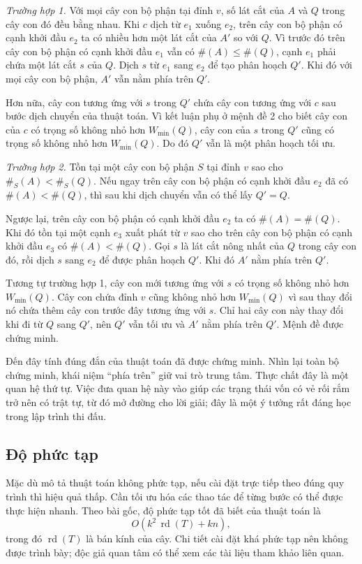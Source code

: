 \documentclass[11pt]{article}
\begin{document}
\emph{Trường hợp 1.} Với mọi cây con bộ phận tại đỉnh $v$, số lát cắt của
$A$ và $Q$ trong cây con đó đều bằng nhau. Khi $c$ dịch từ $e_1$ xuống $e_2$,
trên cây con bộ phận có cạnh khởi đầu $e_2$ ta có nhiều hơn một lát cắt của
$A'$ so với $Q$. Vì trước đó trên cây con bộ phận có cạnh khởi đầu $e_1$ vẫn
có $\#(A)\le \#(Q)$, cạnh $e_1$ phải chứa một lát cắt $s$ của $Q$. Dịch $s$ từ
$e_1$ sang $e_2$ để tạo phân hoạch $Q'$. Khi đó với mọi cây con bộ phận,
$A'$ vẫn nằm phía trên $Q'$.

Hơn nữa, cây con tương ứng với $s$ trong $Q'$ chứa cây con tương ứng với $c$
sau bước dịch chuyển của thuật toán. Vì kết luận phụ ở mệnh đề 2 cho biết cây
con của $c$ có trọng số không nhỏ hơn $W_{\min}(Q)$, cây con của $s$ trong
$Q'$ cũng có trọng số không nhỏ hơn $W_{\min}(Q)$. Do đó $Q'$ vẫn là một phân
hoạch tối ưu.

\emph{Trường hợp 2.} Tồn tại một cây con bộ phận $S$ tại đỉnh $v$ sao cho
$\#_S(A)<\#_S(Q)$. Nếu ngay trên cây con bộ phận có cạnh khởi đầu $e_2$ đã có
$\#(A)<\#(Q)$, thì sau khi dịch chuyển vẫn có thể lấy $Q'=Q$.

Ngược lại, trên cây con bộ phận có cạnh khởi đầu $e_2$ ta có $\#(A)=\#(Q)$.
Khi đó tồn tại một cạnh $e_3$ xuất phát từ $v$ sao cho trên cây con bộ phận có
cạnh khởi đầu $e_3$ có $\#(A)<\#(Q)$. Gọi $s$ là lát cắt nông nhất của $Q$
trong cây con đó, rồi dịch $s$ sang $e_2$ để được phân hoạch $Q'$. Khi đó
$A'$ nằm phía trên $Q'$.

Tương tự trường hợp 1, cây con mới tương ứng với $s$ có trọng số không nhỏ hơn
$W_{\min}(Q)$. Cây con chứa đỉnh $v$ cũng không nhỏ hơn $W_{\min}(Q)$ vì sau
thay đổi nó chứa thêm cây con trước đây tương ứng với $s$. Chỉ hai cây con
này thay đổi khi đi từ $Q$ sang $Q'$, nên $Q'$ vẫn tối ưu và $A'$ nằm phía
trên $Q'$. Mệnh đề được chứng minh.

Đến đây tính đúng đắn của thuật toán đã được chứng minh. Nhìn lại toàn bộ
chứng minh, khái niệm ``phía trên'' giữ vai trò trung tâm. Thực chất đây là
một quan hệ thứ tự. Việc đưa quan hệ này vào giúp các trạng thái vốn có vẻ
rối rắm trở nên có trật tự, từ đó mở đường cho lời giải; đây là một ý tưởng
rất đáng học trong lập trình thi đấu.

\subsection{Độ phức tạp}

Mặc dù mô tả thuật toán không phức tạp, nếu cài đặt trực tiếp theo đúng quy
trình thì hiệu quả thấp. Cần tối ưu hóa các thao tác để từng bước có thể được
thực hiện nhanh. Theo bài gốc, độ phức tạp tốt đã biết của thuật toán là
\[
  O(k^2\,\operatorname{rd}(T)+kn),
\]
trong đó $\operatorname{rd}(T)$ là bán kính của cây. Chi tiết cài đặt khá
phức tạp nên không được trình bày; độc giả quan tâm có thể xem các tài liệu
tham khảo liên quan.
\end{document}

